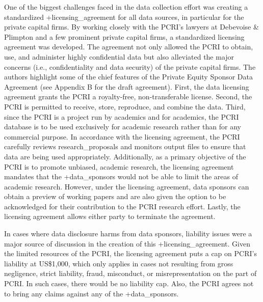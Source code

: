 \documentclass[
]{book}
\begin{document}
One of the biggest challenges faced in the data collection effort was creating a standardized +licensing\_agreement\textbar{} for all data sources, in particular for the private capital firms. By working closely with the PCRI's lawyers at Debevoise \& Plimpton and a few prominent private capital firms, a standardized licensing agreement was developed. The agreement not only allowed the PCRI to obtain, use, and administer highly confidential data but also alleviated the major concerns (i.e., confidentiality and data security) of the private capital firms. The authors highlight some of the chief features of the Private Equity Sponsor Data Agreement (see Appendix B for the draft agreement). First, the data licensing agreement grants the PCRI a royalty-free, non-transferable license. Second, the PCRI is permitted to receive, store, reproduce, and combine the data. Third, since the PCRI is a project run by academics and for academics, the PCRI database is to be used exclusively for academic research rather than for any commercial purpose. In accordance with the licensing agreement, the PCRI carefully reviews research\_proposals and monitors output files to ensure that data are being used appropriately. Additionally, as a primary objective of the PCRI is to promote unbiased, academic research, the licensing agreement mandates that the +data\_sponsors\textbar{} would not be able to limit the areas of academic research. However, under the licensing agreement, data sponsors can obtain a preview of working papers and are also given the option to be acknowledged for their contribution to the PCRI research effort. Lastly, the licensing agreement allows either party to terminate the agreement.

In cases where data disclosure harms from data sponsors, liability issues were a major source of discussion in the creation of this +licensing\_agreement\textbar. Given the limited resources of the PCRI, the licensing agreement puts a cap on PCRI's liability at US\$1,000, which only applies in cases not resulting from gross negligence, strict liability, fraud, misconduct, or misrepresentation on the part of PCRI. In such cases, there would be no liability cap. Also, the PCRI agrees not to bring any claims against any of the +data\_sponsors\textbar.
\end{document}
